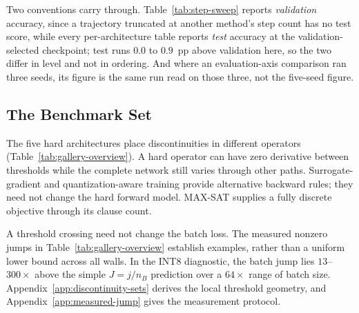 Two conventions carry through. Table~\ref{tab:step-sweep} reports \emph{validation}
accuracy, since a trajectory truncated at another method's step count has no test score,
while every per-architecture table reports \emph{test} accuracy at the
validation-selected checkpoint; test runs $0.0$ to $0.9$~pp above validation here, so the
two differ in level and not in ordering. And where an evaluation-axis comparison ran three
seeds, its \sysname{} figure is the same run read on those three, not the five-seed figure.

\subsection{The Benchmark Set}\label{sec:gallery-overview}

The five hard architectures place discontinuities in different operators
(Table~\ref{tab:gallery-overview}). A hard operator can have zero derivative
between thresholds while the complete network still varies through other paths.
Surrogate-gradient and quantization-aware training provide alternative backward
rules; they need not change the hard forward model. MAX-SAT supplies a fully
discrete objective through its clause count.

A threshold crossing need not change the batch loss. The measured nonzero jumps
in Table~\ref{tab:gallery-overview} establish examples, rather than a uniform
lower bound across all walls. In the INT8 diagnostic, the batch jump lies
$13$--$300\times$ above the simple $J=j/n_B$ prediction over a $64\times$ range
of batch size. Appendix~\ref{app:discontinuity-sets} derives the local threshold
geometry, and Appendix~\ref{app:measured-jump} gives the measurement protocol.

